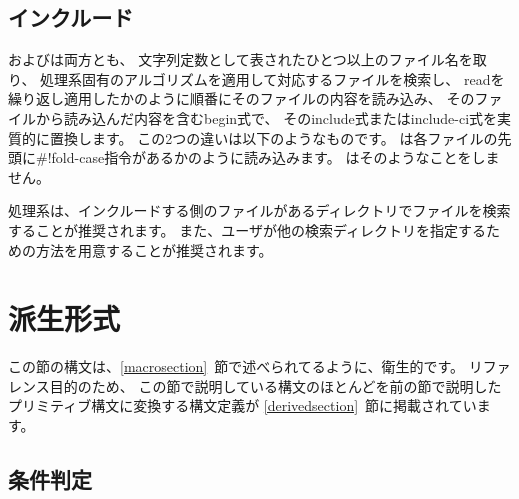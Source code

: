 \subsection{インクルード}\unsection
\label{inclusion}
\begin{entry}{%
}

\semantics
{}およびは両方とも、
文字列定数として表されたひとつ以上のファイル名を取り、
処理系固有のアルゴリズムを適用して対応するファイルを検索し、
{\cf read}を繰り返し適用したかのように順番にそのファイルの内容を読み込み、
そのファイルから読み込んだ内容を含む{\cf begin}式で、
その{\cf include}式または{\cf include-ci}式を実質的に置換します。
この2つの違いは以下のようなものです。
は各ファイルの先頭に{\cf{}\#!fold-case}指令があるかのように読み込みます。
はそのようなことをしません。

\begin{note}
処理系は、インクルードする側のファイルがあるディレクトリでファイルを検索することが推奨されます。
また、ユーザが他の検索ディレクトリを指定するための方法を用意することが推奨されます。
\end{note}

\end{entry}

\section{派生形式}
\label{derivedexps}

この節の構文は、\ref{macrosection}~節で述べられてるように、衛生的です。
リファレンス目的のため、
この節で説明している構文のほとんどを前の節で説明したプリミティブ構文に変換する構文定義が
\ref{derivedsection}~節に掲載されています。


\subsection{条件判定}\unsection


